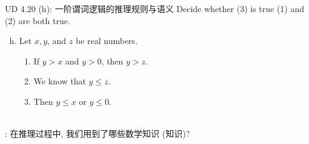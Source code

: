 \begin{frame}{}
  \begin{exampleblock}{UD 4.20 (h): 一阶谓词逻辑的推理规则与语义}
    Decide whether (3) is true  (1) and (2) are both true.

    \begin{enumerate}[(a)]
      \setcounter{enumi}{7}
      \item Let $x,y$, and $z$ be real numbers.
	\begin{enumerate}[(1)]
	  \item If $y > x$ and $y > 0$, then $y > z$.
	  \item We know that $y \le z$.
	  \item Then $y \le x$ or $y \le 0$.
	\end{enumerate}
    \end{enumerate}
  \end{exampleblock}

  \pause
  \vspace{0.30cm}
  \begin{center}
    {} \\[15pt] \pause
    {: 在推理过程中, 我们用到了哪些数学知识 (知识)?}
  \end{center}
\end{frame}

\begin{frame}{}
\end{frame}
